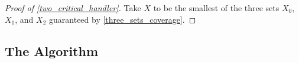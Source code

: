 \documentclass[a4paper,UKenglish, cleveref, autoref, thm-restate]{lipics-v2021}
\begin{document}



\begin{proof}[Proof of \cref{two_critical_handler}]
  Take $X$ to be the smallest of the three sets $X_0$, $X_1$, and $X_2$ guaranteed by \cref{three_sets_coverage}.
\end{proof}


\subsection{The Algorithm}
\end{document}
